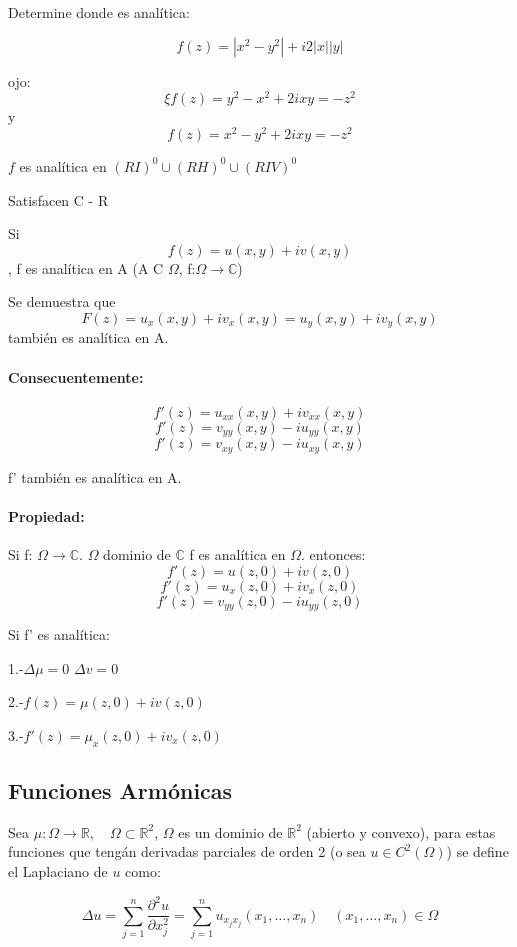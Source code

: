 \documentclass[a4paper,12pt]{article}
\begin{document}
Determine donde es analítica:

\[f(z) = |x^2 - y^2| + i2|x||y|\]

ojo: \[\xi f(z) = y^2 - x^2 + 2ixy = -z^2\] y \[f(z) = x^2 - y^2 + 2ixy = -z^2\]

$f$ es analítica en $(RI)^0 \cup (RH)^0 \cup (RIV)^0$

Satisfacen C - R

Si \[f(z) = u(x, y) + iv(x, y)\], f es analítica en A (A C $\Omega$, f:$\Omega \rightarrow \mathbb{C}$)

Se demuestra que \[F(z) = u_x(x, y) + iv_x(x, y) = u_y(x, y) + iv_y(x, y)\] también es analítica en A.

\paragraph{Consecuentemente:}
\[f'(z) = u_{xx}(x, y) + iv_{xx}(x, y)\]
\[f'(z) = v_{yy}(x, y) - i u_{yy}(x, y)\]
\[f'(z) = v_{xy}(x, y) - i u_{xy}(x, y)\]


f' también es analítica en A.

\paragraph{Propiedad:}

Si f: $\Omega \rightarrow \mathbb{C}$. $\Omega$ dominio de $\mathbb{C}$
f es analítica en $\Omega$. entonces:
\[f' (z) = u(z, 0) + iv(z, 0)\]
\[f' (z) = u_x(z, 0) + iv_x(z, 0)\]
\[f' (z) = v_{yy}(z, 0) - iu_{yy}(z, 0)\]


Si f' es analítica:

1.-$\Delta\mu=0$\text{ , }
$\Delta v=0$ 

2.-$f(z)=\mu(z,0)+ iv(z,0)$

3.-$f'(z)=\mu_x(z,0)+iv_x(z,0)$

\subsection{Funciones Armónicas}

Sea $\mu:\Omega \rightarrow \mathbb{R}, \quad \Omega \subset \mathbb{R}^2$, $\Omega$ es un dominio de $\mathbb{R}^2$ (abierto y convexo), para estas funciones que tengán derivadas parciales de orden 2 (o sea $u \in C^2(\Omega)$) se define el Laplaciano de $u$ como:

$$\Delta u = \sum_{j=1}^{n} \frac{\partial^2 u}{\partial x_j^2} = \sum_{j=1}^{n} u_{x_j x_j}(x_1, \ldots, x_n) \quad (x_1, \ldots, x_n) \in \Omega$$
\end{document}
